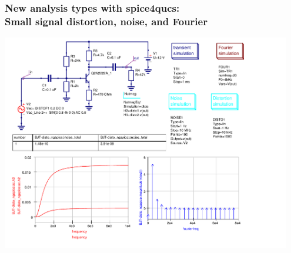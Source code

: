 \documentclass[9pt]{beamer}
\begin{document}
\begin{frame}
 \frametitle{New analysis types with spice4qucs: \\
 Small signal distortion, noise, and Fourier}
\centering
\mbox{}\hspace{1.5cm}\includegraphics[width=0.95\textwidth]{img/BJT-disto.pdf}
\end{frame}
\end{document}
